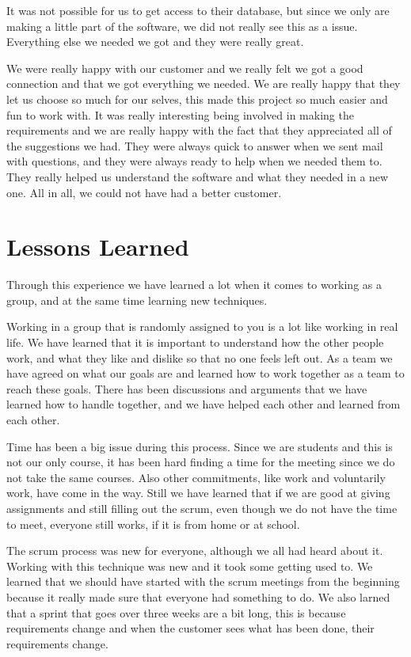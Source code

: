 \documentclass{report}
\begin{document}
It was not possible for us to get access to their database, but since we only are making a little part of the software, we did not really see this as a issue. Everything else we needed we got and they were really great.

We were really happy with our customer and we really felt we got a good connection and that we got everything we needed. We are really happy that they let us choose so much for our selves, this made this project so much easier and fun to work with. It was really interesting being involved in making the requirements and we are really happy with the fact that they appreciated all of the suggestions we had. They were always quick to answer when we sent mail with questions, and they were always ready to help when we needed them to. They really helped us understand the software and what they needed in a new one. All in all, we could not have had a better customer.

\newpage
\section{Lessons Learned} \label{sec:lessons_learned}
Through this experience we have learned a lot when it comes to working as a group, and at the same time learning new techniques.

Working in a group that is randomly assigned to you is a lot like working in real life. We have learned that it is important to understand how the other people work, and what they like and dislike so that no one feels left out. As a team we have agreed on what our goals are and learned how to work together as a team to reach these goals. There has been discussions and arguments that we have learned how to handle together, and we have helped each other and learned from each other.

Time has been a big issue during this process. Since we are students and this is not our only course, it has been hard finding a time for the meeting since we do not take the same courses. Also other commitments, like work and voluntarily work, have come in the way. Still we have learned that if we are good at giving assignments and still filling out the scrum, even though we do not have the time to meet, everyone still works, if it is from home or at school.

The scrum process was new for everyone, although we all had heard about it. Working with this technique was new and it took some getting used to. We learned that we should have started with the scrum meetings from the beginning because it really made sure that everyone had something to do. We also larned that a sprint that goes over three weeks are a bit long, this is because requirements change and when the customer sees what has been done, their requirements change.
\end{document}
